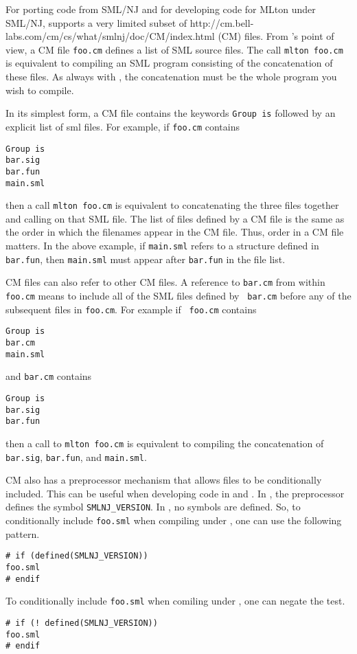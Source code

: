 
For porting code from SML/NJ and for developing code for MLton under SML/NJ,
{\mlton} supports a very limited subset of
		  {http://cm.bell-labs.com/cm/cs/what/smlnj/doc/CM/index.html}
(CM) files.  From {\mlton}'s point of view, a CM file {\tt foo.cm} defines a
list of SML source files.  The call {\tt mlton foo.cm} is equivalent to
compiling an SML program consisting of the concatenation of these files.  As
always with {\mlton}, the concatenation must be the whole program you wish to
compile.

In its simplest form, a CM file contains the keywords {\tt Group is} followed by 
an explicit list of sml files.  For example, if {\tt foo.cm} contains
\begin{verbatim}
Group is
bar.sig
bar.fun
main.sml
\end{verbatim}
then a call {\tt mlton foo.cm} is equivalent to concatenating the three files
together and calling {\mlton} on that SML file.  The list of files defined by a
CM file is the same as the order in which the filenames appear in the CM file.
Thus, order in a CM file matters.  In the above example, if {\tt main.sml}
refers to a structure defined in {\tt bar.fun}, then {\tt main.sml} must appear
after {\tt bar.fun} in the file list.

CM files can also refer to other CM files.  A reference to {\tt bar.cm} from
within {\tt foo.cm} means to include all of the SML files defined by {\tt
bar.cm} before any of the subsequent files in {\tt foo.cm}.  For example if {\tt
foo.cm} contains
\begin{verbatim}
Group is
bar.cm
main.sml
\end{verbatim}
and {\tt bar.cm} contains
\begin{verbatim}
Group is
bar.sig
bar.fun
\end{verbatim}
then a call to {\tt mlton foo.cm} is equivalent to compiling the concatenation
of {\tt bar.sig}, {\tt bar.fun}, and {\tt main.sml}.

CM also has a preprocessor mechanism that allows files to be conditionally
included.  This can be useful when developing code in {\smlnj} and {\mlton}.
In {\smlnj}, the preprocessor defines the symbol {\tt SMLNJ\_VERSION}.  In
{\mlton}, no symbols are defined.  So, to conditionally include {\tt foo.sml}
when compiling under {\smlnj}, one can use the following pattern.
\begin{verbatim}
# if (defined(SMLNJ_VERSION))
foo.sml
# endif
\end{verbatim}
To conditionally include {\tt foo.sml} when comiling under {\mlton}, one can
negate the test.
\begin{verbatim}
# if (! defined(SMLNJ_VERSION))
foo.sml
# endif
\end{verbatim}

